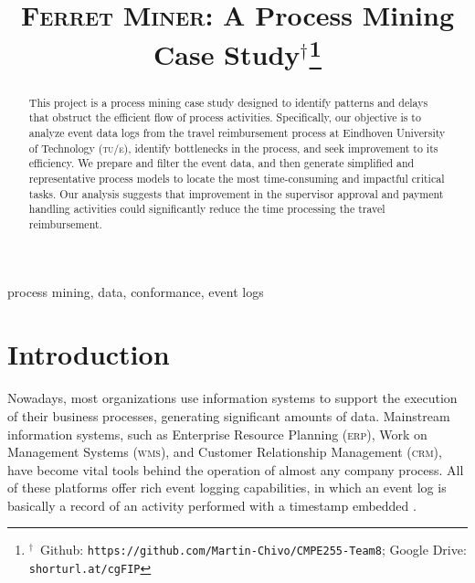 \documentclass[conference]{IEEEtran}
\begin{document}
\title{\textsc{Ferret Miner}: A Process Mining Case
Study${}^\dagger$\thanks{${}^\dagger$~Github: \texttt{https://github.com/Martin-Chivo/CMPE255-Team8}; Google Drive: \texttt{shorturl.at/cgFIP}}}

\author{
\and
{}
\and
{}
\and
{}
}

\maketitle

\begin{abstract}
This project is a process mining case study designed to
identify patterns and
delays that obstruct the efficient flow of process
activities. Specifically, our
objective is to analyze event data logs from
the travel reimbursement process at Eindhoven University of Technology
(\textsc{tu/e}), identify bottlenecks in the process, and
seek improvement to its efficiency.
We prepare and filter the event data, and then generate simplified and
representative process models to locate
the most time-consuming and impactful critical tasks.
Our analysis suggests that
improvement in the supervisor approval and payment handling activities 
could significantly
reduce the time processing the travel reimbursement.
\end{abstract}

\begin{IEEEkeywords}
process mining, data, conformance, event logs
\end{IEEEkeywords}

\section{Introduction}
\label{section-intro}


Nowadays, most organizations use information systems to support
the execution of their business processes, generating significant
amounts of data.
Mainstream information systems, such as Enterprise Resource
Planning (\textsc{erp}), Work on Management Systems (\textsc{wms}), and Customer
Relationship Management (\textsc{crm}), have become vital tools behind the
operation of almost 
any company process\cite{Tuto2022}. All of these platforms
offer rich event logging capabilities, in which
an event log is
basically a record of an activity performed with a timestamp embedded
\cite{Proc2022}.
\end{document}
